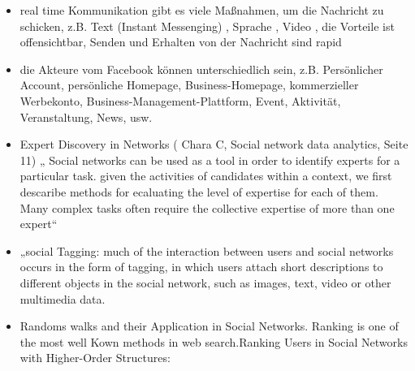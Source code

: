 \begin{itemize}
\item real time Kommunikation gibt es viele Maßnahmen, um die Nachricht zu schicken, z.B. Text (Instant Messenging) , Sprache , Video , die Vorteile ist offensichtbar,  Senden und Erhalten von der Nachricht sind rapid
\item die Akteure vom Facebook können unterschiedlich sein, z.B. Persönlicher Account, persönliche Homepage, Business-Homepage, kommerzieller Werbekonto, Business-Management-Plattform, Event, Aktivität, Veranstaltung, News, usw.
\item Expert Discovery in Networks ( Chara C, Social network data analytics, Seite 11) „ Social networks can be used as a tool in order to identify experts for a particular task. given the activities of candidates within a context, we first descaribe methods for ecaluating the level of expertise for each of them. Many complex tasks often require the collective expertise of more than one expert“
\item „social Tagging:  much of the interaction between users and social networks occurs in the form of tagging, in which users attach short descriptions to different objects in the social network, such as images, text, video or other multimedia data.
\item Randoms walks and their Application in Social Networks. Ranking is one of the most well Kown methods in web search.Ranking Users in Social Networks with Higher-Order Structures:
\end{itemize}